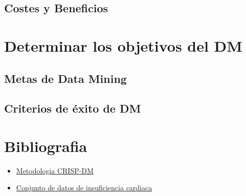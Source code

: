 \documentclass[12pt, letterpaper, spanish]{article}
\begin{document}
\subsection{Costes y Beneficios}
\section{Determinar los objetivos del DM}
\subsection{Metas de Data Mining}
\subsection{Criterios de éxito de DM}
\section{Bibliografia}
\begin{itemize}
    \item \href{https://www.sngular.com/es/crisp-dm-fase-i-comprension-del-negocio/?authuser=0}
    {Metodologia CRISP-DM}
    \item \href{https://www.datos.gov.py/search/type/dataset}
    {Conjunto de datos de insuficiencia cardiaca}
\end{itemize}
\end{document}
